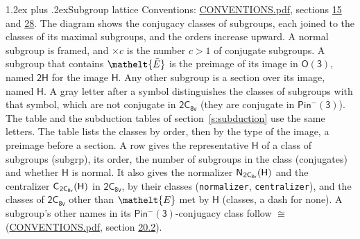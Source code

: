 \documentclass[10pt,a4paper]{article}
\makeatletter
\renewcommand\section{\@startsection{section}{1}{\z@}{-3ex plus -1ex minus -.2ex}%
  {1.2ex plus .2ex}{\normalfont\large\sffamily\bfseries\color{parttitle}}}
\numberwithin{equation}{section}
\newcommand{\eltfont}[1]{{\let\sigma\eltsigma\mathelt{#1}}}
\newcommand{\grp}[1]{\mathsf{#1}}
\newcommand{\cls}[1]{\eltfont{#1}}
\newcommand{\elt}[1]{\eltfont{#1}}
\newcommand{\samecls}{\cong}
\newcommand{\barred}[1]{\bar{#1}}
\newcommand{\hairsp}{\mkern1mu}
\makeatother
\begin{document}
\section{Subgroup lattice}\label{s:subgroups}
Conventions: \href{../../CONVENTIONS.pdf}{CONVENTIONS.pdf}, sections \href{../../../rotation/CONVENTIONS.pdf\#conv.15}{15} and \href{../../CONVENTIONS.pdf\#conv.28}{28}.
The diagram shows the conjugacy classes of subgroups, each joined to the classes of its maximal subgroups, and the orders increase upward. \label{n:index.conjugates.c}\label{n:mark.conjugates}A normal subgroup is framed, and ${\times}c$ is the number $c > 1$ of conjugate subgroups. \label{n:group.H}A subgroup that contains $\elt{\barred{E}}$ is the preimage of its image in $\grp{O(3)}$, named $\grp{2H}$ for the image $\grp{H}$. Any other subgroup is a section over its image, named $\grp{H}$. \label{n:mark.letter}A gray letter after a symbol distinguishes the classes of subgroups with that symbol, which are not conjugate in $\grp{2C_{8v}}$ (they are conjugate in \href{Pinminus3.pdf}{$\grp{Pin^{-}(3)}$}). The table and the subduction tables of section~\ref{s:subduction} use the same letters. The table lists the classes by order, then by the type of the image, a preimage before a section. \label{n:head.subgroup}\label{n:head.order}\label{n:head.conjugates}\label{n:head.normal}A row gives the representative $\grp{H}$ of a class of subgroups (subgrp), its order, the number of subgroups in the class (conjugates) and whether $\grp{H}$ is normal. \label{n:group.normalizer}\label{n:group.centralizer}\label{n:head.classes}It also gives the normalizer $\grp{N}_{\hairsp \grp{2C_{8v}}}(\grp{H})$ and the centralizer $\grp{C}_{\hairsp \grp{2C_{8v}}}(\grp{H})$ in $\grp{2C_{8v}}$, by their classes (\texttt{normalizer}, \texttt{centralizer}), and the classes of $\grp{2C_{8v}}$ other than $\cls{E}$ met by $\grp{H}$ (classes, a dash for none). A subgroup's other names in its \href{Pinminus3.pdf}{$\grp{Pin^{-}(3)}$}-conjugacy class follow $\samecls$ (\href{../../CONVENTIONS.pdf}{CONVENTIONS.pdf}, section \href{../../CONVENTIONS.pdf\#conv.20.2}{20.2}).
\end{document}
